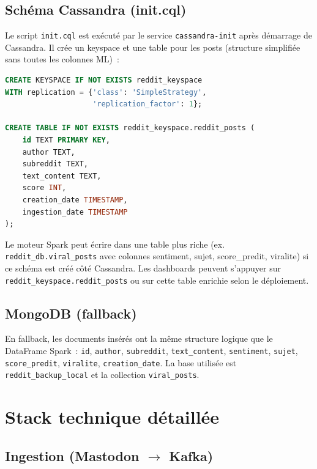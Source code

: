 \documentclass[12pt,a4paper]{article}
\begin{document}
\subsection{Schéma Cassandra (init.cql)}

Le script \texttt{init.cql} est exécuté par le service \texttt{cassandra-init} après démarrage de Cassandra. Il crée un keyspace et une table pour les posts (structure simplifiée sans toutes les colonnes ML)~:

\begin{lstlisting}[language=SQL,caption=Schéma Cassandra (extrait init.cql)]
CREATE KEYSPACE IF NOT EXISTS reddit_keyspace
WITH replication = {'class': 'SimpleStrategy', 
                    'replication_factor': 1};

CREATE TABLE IF NOT EXISTS reddit_keyspace.reddit_posts (
    id TEXT PRIMARY KEY,
    author TEXT,
    subreddit TEXT,
    text_content TEXT,
    score INT,
    creation_date TIMESTAMP,
    ingestion_date TIMESTAMP
);
\end{lstlisting}

Le moteur Spark peut écrire dans une table plus riche (ex. \texttt{reddit\_db.viral\_posts} avec colonnes sentiment, sujet, score\_predit, viralite) si ce schéma est créé côté Cassandra. Les dashboards peuvent s'appuyer sur \texttt{reddit\_keyspace.reddit\_posts} ou sur cette table enrichie selon le déploiement.

\subsection{MongoDB (fallback)}

En fallback, les documents insérés ont la même structure logique que le DataFrame Spark~: \texttt{id}, \texttt{author}, \texttt{subreddit}, \texttt{text\_content}, \texttt{sentiment}, \texttt{sujet}, \texttt{score\_predit}, \texttt{viralite}, \texttt{creation\_date}. La base utilisée est \texttt{reddit\_backup\_local} et la collection \texttt{viral\_posts}.

\section{Stack technique détaillée}

\subsection{Ingestion (Mastodon $\rightarrow$ Kafka)}
\end{document}
